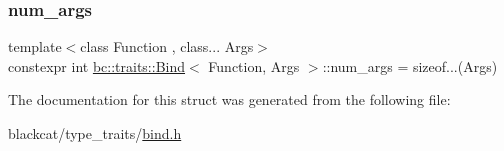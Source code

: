 \subsubsection{\texorpdfstring{num\+\_\+args}{num\_args}}
{\footnotesize\ttfamily template$<$class Function , class... Args$>$ \\
constexpr int \hyperlink{structbc_1_1traits_1_1Bind}{bc\+::traits\+::\+Bind}$<$ Function, Args $>$\+::num\+\_\+args = sizeof...(Args)\hspace{0.3cm}{\ttfamily [static]}}



The documentation for this struct was generated from the following file\+:\begin{DoxyCompactItemize}
\item 
blackcat/type\+\_\+traits/\hyperlink{bind_8h}{bind.\+h}\end{DoxyCompactItemize}
